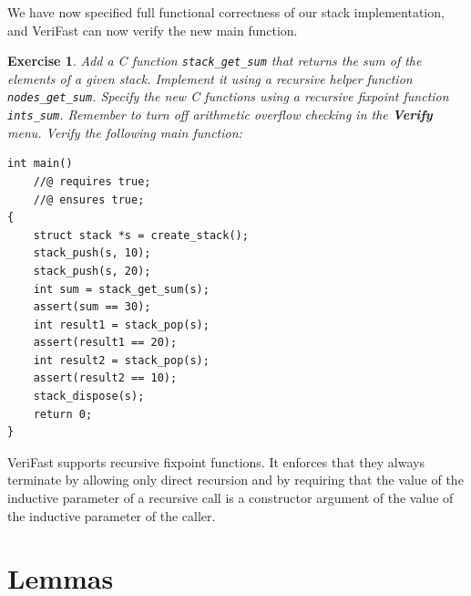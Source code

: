 \documentclass{article}
\newtheorem{exercise}{Exercise}
\begin{document}
We have now specified full functional correctness of our stack
implementation, and VeriFast can now verify the new main
function.

\begin{exercise}\label{exercise:sum_full}
Add a C function \lstinline!stack_get_sum! that returns the sum
of the elements of a given stack. Implement it using a
recursive helper function \lstinline!nodes_get_sum!. Specify
the new C functions using a recursive fixpoint function
\lstinline!ints_sum!. Remember to turn off arithmetic
overflow checking in the \textbf{Verify} menu. Verify the
following main function:
\end{exercise}
\begin{lstlisting}
int main()
    //@ requires true;
    //@ ensures true;
{
    struct stack *s = create_stack();
    stack_push(s, 10);
    stack_push(s, 20);
    int sum = stack_get_sum(s);
    assert(sum == 30);
    int result1 = stack_pop(s);
    assert(result1 == 20);
    int result2 = stack_pop(s);
    assert(result2 == 10);
    stack_dispose(s);
    return 0;
}
\end{lstlisting}

VeriFast supports recursive fixpoint functions. It enforces
that they always terminate by allowing only direct recursion
and by requiring that the value of the inductive parameter of a
recursive call is a constructor argument of the value of the
inductive parameter of the caller.

\section{Lemmas}\label{section:lemmas}
\end{document}
